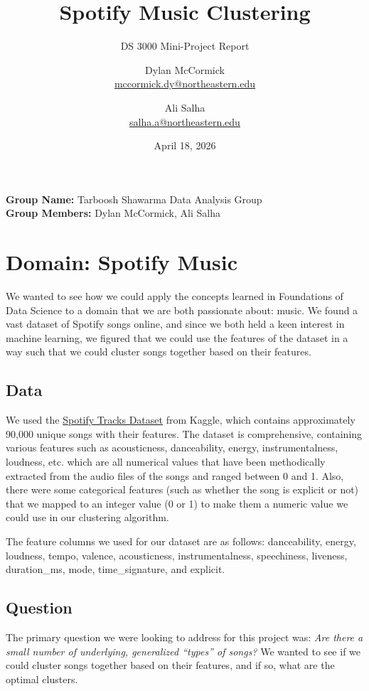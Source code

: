 \documentclass[11pt]{article}
\title{Spotify Music Clustering}
\subtitle{DS 3000 Mini-Project Report}
\author{Dylan McCormick\\\href{mailto:mccormick.dy@northeastern.edu}{mccormick.dy@northeastern.edu} \and Ali Salha\\\href{mailto:salha.a@northeastern.edu}{salha.a@northeastern.edu}}
\date{April 18, 2026}
\begin{document}
\maketitle

\textbf{Group Name:} Tarboosh Shawarma Data Analysis Group\\
\textbf{Group Members:} Dylan McCormick, Ali Salha

\section{Domain: Spotify Music}

We wanted to see how we could apply the concepts learned in Foundations of Data Science to a domain that we are both passionate about: music. We found a vast dataset of Spotify songs online, and since we both held a keen interest in machine learning, we figured that we could use the features of the dataset in a way such that we could cluster songs together based on their features.

\subsection{Data}
\label{sec:data}

We used the \href{https://www.kaggle.com/datasets/maharshipandya/-spotify-tracks-dataset}{Spotify Tracks Dataset} from Kaggle, which contains approximately 90,000 unique songs with their features. The dataset is comprehensive, containing various features such as acousticness, danceability, energy, instrumentalness, loudness, etc. which are all numerical values that have been methodically extracted from the audio files of the songs and ranged between 0 and 1. Also, there were some categorical features (such as whether the song is explicit or not) that we mapped to an integer value (0 or 1) to make them a numeric value we could use in our clustering algorithm.

The feature columns we used for our dataset are as follows: danceability, energy, loudness, tempo, valence, acousticness, instrumentalness, speechiness, liveness, duration\_ms, mode, time\_signature, and explicit.

\subsection{Question}

The primary question we were looking to address for this project was: \textit{Are there a small number of underlying, generalized “types” of songs?} We wanted to see if we could cluster songs together based on their features, and if so, what are the optimal clusters.
\end{document}
